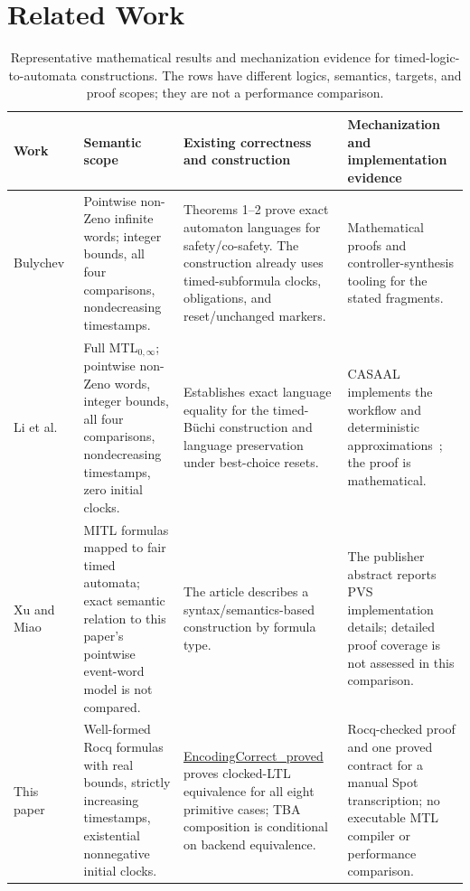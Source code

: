 \documentclass{ieeeaccess}
\newcommand{\Rocqid}[1]{\url{#1}}
\begin{document}
\section{Related Work}
\label{sec:related}
\begin{table}[!t]
\centering
\caption{Representative mathematical results and mechanization evidence for
timed-logic-to-automata constructions. The rows have different logics,
semantics, targets, and proof scopes; they are not a performance comparison.}
\label{tab:prior-construction-comparison}
\begin{tabular}{@{}p{}p{}p{}p{}@{}}
\toprule
Work & Semantic scope & Existing correctness and construction & Mechanization and implementation evidence\\
\midrule
Bulychev~\cite{[BDLG14]} & Pointwise non-Zeno infinite words; integer bounds, all four comparisons, nondecreasing timestamps. & Theorems 1--2 prove exact automaton languages for safety/co-safety. The construction already uses timed-subformula clocks, obligations, and reset/unchanged markers. & Mathematical proofs and controller-synthesis tooling for the stated fragments.\\
Li et al.~\cite{li_spin7} & Full MTL$_{0,\infty}$; pointwise non-Zeno words, integer bounds, all four comparisons, nondecreasing timestamps, zero initial clocks. & Establishes exact language equality for the timed-B\"uchi construction and language preservation under best-choice resets. & CASAAL implements the workflow and deterministic approximations~\cite{casaal_tool}; the proof is mathematical.\\
Xu and Miao~\cite{xu08} & MITL formulas mapped to fair timed automata; exact semantic relation to this paper's pointwise event-word model is not compared. & The article describes a syntax/semantics-based construction by formula type. & The publisher abstract reports PVS implementation details; detailed proof coverage is not assessed in this comparison.\\
This paper & Well-formed Rocq formulas with real bounds, strictly increasing timestamps, existential nonnegative initial clocks. & \Rocqid{EncodingCorrect_proved} proves clocked-LTL equivalence for all eight primitive cases; TBA composition is conditional on backend equivalence. & Rocq-checked proof and one proved contract for a manual Spot transcription; no executable MTL compiler or performance comparison.\\
\bottomrule
\end{tabular}
\end{table}
\end{document}
